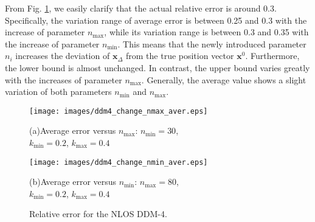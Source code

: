 \documentclass[journal]{IEEEtran}
\begin{document}
From Fig. \ref{fig:Fig6}, we easily clarify that the actual relative error is around 0.3. Specifically, the variation range of average error is between 0.25 and 0.3 with the increase of parameter ${n_{\max}}$, while its variation range is between 0.3 and 0.35 with the increase of parameter ${n_{\min}}$. This means that the newly introduced parameter ${n_i}$ increases the deviation of $\mathbf{x}_{\Delta}$ from the true position vector $\mathbf{x}^0$. Furthermore, the lower bound is almost unchanged. In contrast, the upper bound varies greatly with the increases of parameter ${n_{\max}}$. Generally, the average value shows a slight variation of both parameters ${n_{\min}}$ and ${n_{\max}}$.

\begin{figure}[htb!]
   \centering
   \begin{minipage}{0.3\textwidth}
       \centering
       \texttt{[image: images/ddm4\_change\_nmax\_aver.eps]}
       \caption*{(a)\quad Average error versus ${n_{\max}} $: ${n_{\min}=30}$,
       \\${{k_{\min}} =0.2}$, ${k_{\max} =0.4}$
       }
   \end{minipage}
   \vspace{0.5cm} %
   \begin{minipage}{0.3\textwidth}
       \centering
       \texttt{[image: images/ddm4\_change\_nmin\_aver.eps]}
       \caption*{(b)\quad Average error versus ${n_{\min}} $: ${n_{\max}=80}$,
       \\${{k_{\min}} =0.2}$, ${k_{\max} =0.4}$}
   \end{minipage}
   \vspace{-0.5cm}
   \caption{Relative error for the NLOS DDM-4.}
   \label{fig:Fig6}
\end{figure}
\end{document}
